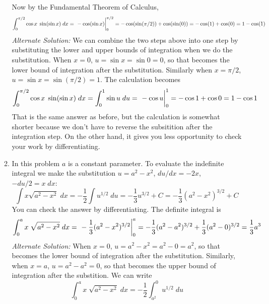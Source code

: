 \documentclass{article}
\begin{document}
\begin{enumerate}
\begin{enumerate}
    Now by the Fundamental Theorem of Calculus,
    \begin{equation*}
      \int_0^{\pi/2} \cos x \; \sin(\sin x) \; dx
      = \left. \vphantom{\int} -\cos(\sin x) \right|_0^{\pi/2}
      = -\cos(\sin(\pi/2)) + \cos(\sin(0))
      = -\cos(1) + \cos(0) = 1 - \cos(1)
    \end{equation*}
    \emph{Alternate Solution:} We can combine the two steps above into
    one step by substituting the lower and upper bounds of integration
    when we do the substitution.  When $x=0$, $u=\sin x = \sin 0 = 0$,
    so that becomes the lower bound of integration after the
    substitution.  Similarly when $x=\pi/2$,
    $u=\sin x = \sin(\pi/2) = 1$.  The calculation becomes
    \begin{equation*}
      \int_0^{\pi/2} \cos x \; \sin(\sin x) \; dx
      = \int_0^1 \sin u \; du
      = \left. \vphantom{\int} -\cos u \right|_0^1
      = -\cos 1 + \cos 0 = 1 - \cos 1
    \end{equation*}
    That is the same answer as before, but the calculation is somewhat
    shorter because we don't have to reverse the subsitition after the
    integration step.  On the other hand, it gives you less
    opportunity to check your work by differentiating.
  \item In this problem $a$ is a constant parameter.  To evaluate the
    indefinite integral we make the substitution $u=a^2-x^2$, $du/dx =
    -2x$, $-du/2 = x \; dx$:
    \begin{equation*}
      \int x \sqrt{a^2-x^2} \; dx
      = -\frac{1}{2} \int u^{1/2} \; du
      = -\frac{1}{3} u^{3/2} + C
      = -\frac{1}{3} (a^2-x^2)^{3/2} + C
    \end{equation*}
    You can check the answer by differentiating.
    The definite integral is
    \begin{equation*}
      \int_0^a x \; \sqrt{a^2-x^2} \; dx
      = \left. \vphantom{\int} -\frac{1}{3} (a^2-x^2)^{3/2}
      \right|_0^a
      = -\frac{1}{3} (a^2-a^2)^{3/2} + \frac{1}{3} (a^2-0)^{3/2}
      = \frac{1}{3} a^3
    \end{equation*}
    \emph{Alternate Solution:} When $x=0$, $u=a^2-x^2=a^2-0=a^2$, so
    that becomes the lower bound of integration after the
    substitution.  Similarly, when $x=a$, $u=a^2-a^2 = 0$, so that
    becomes the upper bound of integration after the substition.  We
    can write
    \begin{equation*}
      \int_0^a x \; \sqrt{a^2-x^2} \; dx
      = -\frac{1}{2} \int_{a^2}^0 u^{1/2} \; du

\end{equation*}
\end{enumerate}
\end{enumerate}
\end{document}
